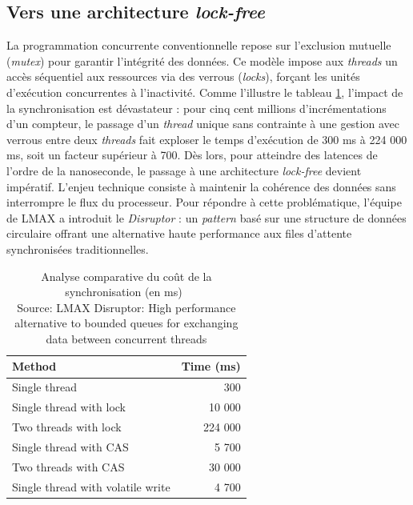 \subsection{Vers une architecture \textit{lock-free}}

La programmation concurrente conventionnelle repose sur l'exclusion mutuelle (\textit{mutex}) pour garantir l'intégrité des données. Ce modèle impose aux \textit{threads} un accès séquentiel aux ressources via des verrous (\textit{locks}), forçant les unités d'exécution concurrentes à l'inactivité. Comme l'illustre le tableau \ref{tab:comparaison_sync}, l'impact de la synchronisation est dévastateur : pour cinq cent millions d'incrémentations d'un compteur, le passage d'un \textit{thread} unique sans contrainte à une gestion avec verrous entre deux \textit{threads} fait exploser le temps d'exécution de 300 ms à 224 000 ms, soit un facteur supérieur à 700. Dès lors, pour atteindre des latences de l'ordre de la nanoseconde, le passage à une architecture \textit{lock-free} devient impératif. L'enjeu technique consiste à maintenir la cohérence des données sans interrompre le flux du processeur. Pour répondre à cette problématique, l'équipe de LMAX a introduit le \textit{Disruptor} : un \textit{pattern} basé sur une structure de données circulaire offrant une alternative haute performance aux files d'attente synchronisées traditionnelles.

\begin{table}[h!]
    \centering
    \begin{tabular}{|l|r|} %
        \hline
        \textbf{Method} & \textbf{Time (ms)} \\ \hline
        Single thread & 300 \\ \hline
        Single thread with lock & 10 000 \\ \hline
        Two threads with lock & 224 000 \\ \hline
        Single thread with CAS & 5 700 \\ \hline
        Two threads with CAS & 30 000 \\ \hline
        Single thread with volatile write & 4 700 \\ \hline
    \end{tabular}
    \caption{Analyse comparative du coût de la synchronisation (en ms) \\ Source: LMAX Disruptor: High performance alternative to bounded queues for exchanging data between concurrent threads}
    \label{tab:comparaison_sync} %
\end{table}

